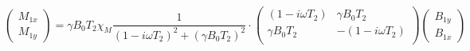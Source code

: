 \documentclass[12pt]{article}
\begin{document}
\begin{large}
\begin{equation*}
    \begin{pmatrix}
        M_{1x} \\
        M_{1y}
    \end{pmatrix}
    = \gamma B_0 T_2 \chi_M \frac{1}{\left( 1 -i\omega T_2 \right)^2 + \left( \gamma B_0 T_2 \right)^2} \cdot
    \begin{pmatrix}
        \left( 1 -i\omega T_2 \right) & \gamma B_0 T_2 \\
         \gamma B_0 T_2 & - \left( 1 -i\omega T_2 \right) \\
    \end{pmatrix}
    \begin{pmatrix}
        B_{1y} \\
        B_{1x}
    \end{pmatrix}
\end{equation*}


\end{large}
\end{document}
